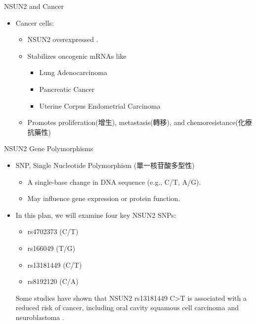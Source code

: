 \documentclass[12pt, aspectratio=43]{beamer}
\begin{document}
\begin{frame}{NSUN2 and Cancer}

\begin{itemize}
    \item Cancer cells:
    \begin{itemize}
        \item NSUN2 overexpressed \cite{Okamoto2012}.
        \item Stabilizes oncogenic mRNAs like
	\begin{itemize}
		\item Lung Adenocarcinoma \cite{Li2025}
		\item Pancreatic Cancer \cite{Zhang2023}
		\item Uterine Corpus Endometrial Carcinoma \cite{YangRNA}
	\end{itemize}
        \item Promotes proliferation(增生), metastasis(轉移), and chemoresistance(化療抗藥性)
    \end{itemize}
\end{itemize}
\end{frame}

\begin{frame}{NSUN2 Gene Polymorphisms}
	\begin{itemize}
		\item SNP, Single Nucleotide Polymorphism (單一核苷酸多型性)
		\begin{itemize}
			\item A single-base change in DNA sequence (e.g., C/T, A/G).  
			\item May influence gene expression or protein function. 
		\end{itemize}
		
		\item In this plan, we will examine four key NSUN2 SNPs:
		\begin{itemize}
			\item rs4702373 (C/T)  
			\item rs166049 (T/G)  
			\item rs13181449 (C/T)  
			\item rs8192120 (C/A)
		\end{itemize}
		Some studies have shown that NSUN2 rs13181449 C>T is associated with a reduced risk of cancer, including oral cavity squamous cell carcinoma \cite{Hung2025NSUN2} and neuroblastoma \cite{LIN2023147120}.
	\end{itemize}
\end{frame}
\end{document}
